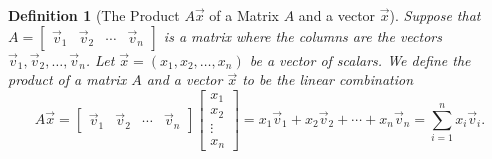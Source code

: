 \documentclass[letterpaper,oneside]{book}%
\theoremstyle{plain}
\theoremstyle{box}
\newtheorem{definition}[theorem]{Definition}
\theoremstyle{problem}
\begin{document}
\begin{definition}[The Product $A\vec x$ of a Matrix $A$ and a vector $\vec x$]
Suppose that $A = \begin{bmatrix}\vec v_1&\vec v_2&\cdots& \vec v_n\end{bmatrix}$
is a matrix where the columns are the vectors $\vec v_1, \vec v_2,\ldots, \vec v_n$. 
Let $\vec x = (x_1,x_2,\ldots,x_n)$ be a vector of scalars. 
We define the product of a matrix $A$ and a vector $\vec x$ to be the linear combination
$$
A\vec x = \begin{bmatrix}\vec v_1&\vec v_2&\cdots& \vec v_n\end{bmatrix} \begin{bmatrix}x_1\\ x_2 \\ \vdots \\ x_n \end{bmatrix} = x_1\vec v_1+x_2\vec v_2+\cdots+x_n\vec v_n = \sum_{i=1}^n x_i \vec v_i.
$$ 
\end{definition}
\end{document}
